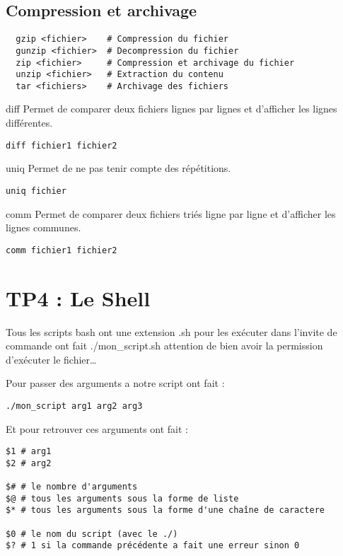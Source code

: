 \documentclass{article}
\begin{document}
\subsection{Compression et archivage}
\begin{verbatim}
  gzip <fichier>    # Compression du fichier
  gunzip <fichier>  # Decompression du fichier
  zip <fichier>     # Compression et archivage du fichier
  unzip <fichier>   # Extraction du contenu
  tar <fichiers>    # Archivage des fichiers
\end{verbatim}

diff
Permet de comparer deux fichiers lignes par lignes et d'afficher les lignes différentes.
\begin{verbatim}
diff fichier1 fichier2
\end{verbatim}

uniq
Permet de ne pas tenir compte des répétitions.
\begin{verbatim}
uniq fichier
\end{verbatim}

comm
Permet de comparer deux fichiers triés ligne par ligne et d'afficher les lignes communes.
\begin{verbatim}
comm fichier1 fichier2
\end{verbatim}

\section{TP4 : Le Shell}

Tous les scripts bash ont une extension .sh pour les exécuter dans l'invite de commande ont fait ./mon\_script.sh attention de bien avoir la permission d'exécuter le fichier\dots

Pour passer des arguments a notre script ont fait :
\begin{verbatim}
./mon_script arg1 arg2 arg3
\end{verbatim}

Et pour retrouver ces arguments ont fait :

\begin{verbatim}
$1 # arg1
$2 # arg2

$# # le nombre d'arguments
$@ # tous les arguments sous la forme de liste
$* # tous les arguments sous la forme d'une chaîne de caractere

$0 # le nom du script (avec le ./)
$? # 1 si la commande précédente a fait une erreur sinon 0
\end{verbatim}
\end{document}
